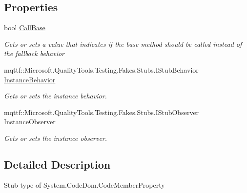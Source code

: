 \subsection*{Properties}
\begin{DoxyCompactItemize}
\item 
bool \hyperlink{class_system_1_1_code_dom_1_1_fakes_1_1_stub_code_member_property_a22b4a064651a1be72b9f2cf6aa1b3c0d}{Call\-Base}
\begin{DoxyCompactList}\small\item\em Gets or sets a value that indicates if the base method should be called instead of the fallback behavior\end{DoxyCompactList}\item 
mqttf\-::\-Microsoft.\-Quality\-Tools.\-Testing.\-Fakes.\-Stubs.\-I\-Stub\-Behavior \hyperlink{class_system_1_1_code_dom_1_1_fakes_1_1_stub_code_member_property_aa743e0a8ea935366aca0b719b1b58e38}{Instance\-Behavior}
\begin{DoxyCompactList}\small\item\em Gets or sets the instance behavior.\end{DoxyCompactList}\item 
mqttf\-::\-Microsoft.\-Quality\-Tools.\-Testing.\-Fakes.\-Stubs.\-I\-Stub\-Observer \hyperlink{class_system_1_1_code_dom_1_1_fakes_1_1_stub_code_member_property_a48a1bbe7b0424c96b2a2cee59c324fa0}{Instance\-Observer}
\begin{DoxyCompactList}\small\item\em Gets or sets the instance observer.\end{DoxyCompactList}\end{DoxyCompactItemize}


\subsection{Detailed Description}
Stub type of System.\-Code\-Dom.\-Code\-Member\-Property



